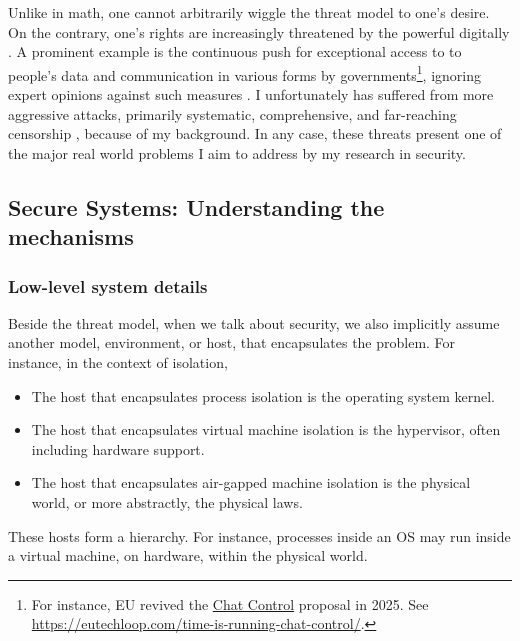\documentclass[10pt]{article}
\begin{document}
Unlike in math, one cannot arbitrarily wiggle the threat model to one's desire.
On the contrary, one's rights are increasingly threatened by the
powerful digitally \cite{eu.digital.1, eu.digital.2, internet.shutdown.2024}. A
prominent example is the continuous push for exceptional access to to people's
data and communication in various forms by governments\footnote{ For instance,
	EU revived the \href{
https://eur-lex.europa.eu/legal-content/EN/TXT/?uri=COM\%3A2022\%3A209\%3AFIN}
{Chat Control} proposal in 2025. See \url{
https://eutechloop.com/time-is-running-chat-control/}.}, ignoring expert
opinions against such measures \cite{keys.under.doormats, bugs.in.our.pockets,
chatcontrolchildprotection}.
I unfortunately has suffered from more aggressive attacks, primarily
systematic, comprehensive, and far-reaching censorship \cite{internet.coup}
\cite[Sect.~5]{chall.censor.circum}, because of my background. In any case,
these threats present one of the major real world problems I aim to address by
my research in security.

\subsection[Secure Systems]{
Secure Systems: Understanding the mechanisms} 
\label{sec.secure.systems}

\subsubsection{Low-level system details}
Beside the threat model, when we talk about security, we also implicitly assume
another model, environment, or host, that encapsulates the problem. For
instance, in the context of isolation, 
\begin{itemize}
	\item The host that encapsulates process isolation is the operating system
		kernel.
	\item The host that encapsulates virtual machine isolation is the
		hypervisor, often including hardware support.
	\item The host that encapsulates air-gapped machine isolation is the
		physical world, or more abstractly, the physical laws.
\end{itemize} 
These hosts form a hierarchy. For instance, processes inside an OS may run
inside a virtual machine, on hardware, within the physical world.
\end{document}
